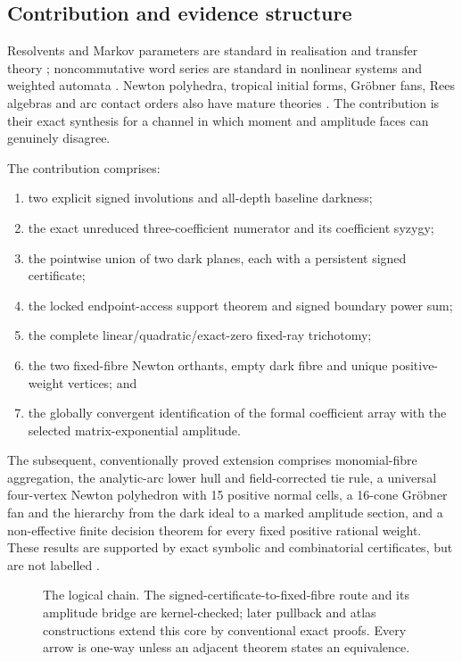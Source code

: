 \subsection{Contribution and evidence structure}

Resolvents and Markov parameters are standard in realisation and transfer
theory \parencite{HoKalman1966,Noferini2023}; noncommutative word series are
standard in nonlinear systems and weighted automata
\parencite{Fliess1981,Sakarovitch2009,BerstelReutenauer2010}.  Newton
polyhedra, tropical initial forms, Gr\"obner fans, Rees algebras and arc
contact orders also have mature theories
\parencite{Kouchnirenko1976,Varchenko1976,MaclaganSturmfels2015,Fukuda2007,Ein2004}.
The contribution is their exact synthesis for a channel in which moment and
amplitude faces can genuinely disagree.

The  contribution comprises:
\begin{enumerate}[label=(\roman*)]
\item two explicit signed involutions and all-depth baseline darkness;
\item the exact unreduced three-coefficient numerator and its coefficient
      syzygy;
\item the pointwise union of two dark planes, each with a persistent signed
      certificate;
\item the locked endpoint-access support theorem and signed boundary power sum;
\item the complete linear/quadratic/exact-zero fixed-ray trichotomy;
\item the two fixed-fibre Newton orthants, empty dark fibre and unique
      positive-weight vertices; and
\item the globally convergent identification of the formal coefficient array
      with the selected matrix-exponential amplitude.
\end{enumerate}

The subsequent, conventionally proved extension comprises monomial-fibre
aggregation, the analytic-arc lower hull and field-corrected tie rule, a
universal four-vertex Newton polyhedron with 15 positive normal cells, a
16-cone Gr\"obner fan and the hierarchy from the dark ideal to a marked
amplitude section, and a non-effective finite decision theorem for every fixed
positive rational weight.  These results are supported by exact symbolic and
combinatorial certificates, but are not labelled .

\begin{figure}[ht]
\centering
\caption{The logical chain.  The signed-certificate-to-fixed-fibre route and
its amplitude bridge are kernel-checked; later pullback and atlas constructions
extend this core by conventional exact proofs.  Every arrow is one-way unless
an adjacent theorem states an equivalence.}
\label{fig:chain}
\end{figure}

